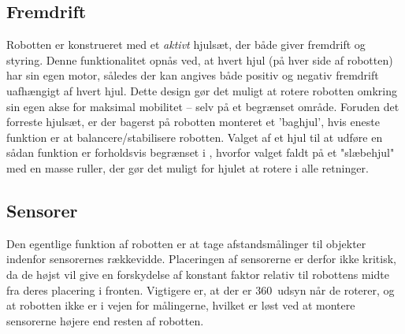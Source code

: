 \subsection{Fremdrift}
Robotten er konstrueret med et \textit{aktivt} hjulsæt, der både giver fremdrift og styring.
Denne funktionalitet opnås ved, at hvert hjul (på hver side af robotten) har sin egen motor, således der kan angives både positiv og negativ fremdrift uafhængigt af hvert hjul.
Dette design gør det muligt at rotere robotten omkring sin egen akse for maksimal mobilitet -- selv på et begrænset område.
Foruden det forreste hjulsæt, er der bagerst på robotten monteret et 'baghjul', hvis eneste funktion er at balancere/stabilisere robotten.
Valget af et hjul til at udføre en sådan funktion er forholdsvis begrænset i \lego, hvorfor valget faldt på et "slæbehjul" med en masse ruller, der gør det muligt for hjulet at rotere i alle retninger.

\subsection{Sensorer}
Den egentlige funktion af robotten er at tage afstandsmålinger til objekter indenfor sensorernes rækkevidde.
Placeringen af sensorerne er derfor ikke kritisk, da de højst vil give en forskydelse af konstant faktor relativ til robottens midte fra deres placering i fronten.
Vigtigere er, at der er 360\degree~udsyn når de roterer, og at robotten ikke er i vejen for målingerne, hvilket er løst ved at montere sensorerne højere end resten af robotten.